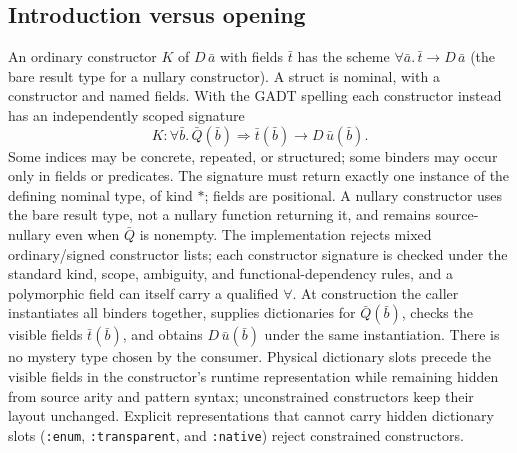 \documentclass[11pt]{article}
\theoremstyle{definition}
\newcommand{\code}[1]{\texttt{#1}}
\newcommand{\arr}{\mathbin{\to}}
\begin{document}
\subsection{Introduction versus opening}
An ordinary constructor $K$ of $D\,\bar a$ with fields $\bar t$ has the
scheme $\forall\bar a.\,\bar t\arr D\,\bar a$ (the bare result type for a
nullary constructor). A struct is nominal, with a constructor and named
fields. With the GADT spelling each constructor instead has an independently
scoped signature
\[
        K:\forall\bar b.\,\bar Q(\bar b)\Rightarrow
          \bar t(\bar b)\arr D\,\bar u(\bar b).
                                                        \tag{K}
\]
Some indices may be concrete, repeated, or structured; some binders may
occur only in fields or predicates. The signature must return exactly one
instance of the defining nominal type, of kind $*$; fields are positional.
A nullary constructor uses the bare result type, not a nullary function
returning it, and remains source-nullary even when $\bar Q$ is nonempty.
The implementation rejects mixed ordinary/signed constructor lists; each
constructor signature is checked under the standard kind, scope, ambiguity,
and functional-dependency rules, and a polymorphic field can itself carry a
qualified $\forall$. At construction the caller instantiates all binders
together, supplies dictionaries for $\bar Q(\bar b)$, checks the visible
fields $\bar t(\bar b)$, and obtains $D\,\bar u(\bar b)$ under the same
instantiation. There is no mystery type chosen by the consumer. Physical
dictionary slots precede the visible fields in the constructor's runtime
representation while remaining hidden from source arity and pattern syntax;
unconstrained constructors keep their layout unchanged. Explicit
representations that cannot carry hidden dictionary slots
(\code{:enum}, \code{:transparent}, and \code{:native}) reject constrained
constructors.
\end{document}
